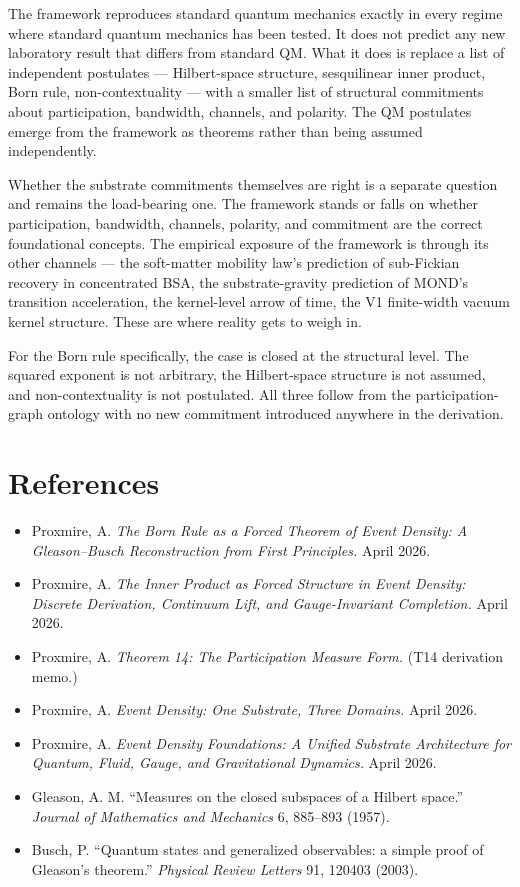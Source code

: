 \documentclass[11pt,a4paper]{article}
\begin{document}
The framework reproduces standard quantum mechanics exactly in every regime where standard quantum mechanics has been tested. It does not predict any new laboratory result that differs from standard QM. What it does is replace a list of independent postulates --- Hilbert-space structure, sesquilinear inner product, Born rule, non-contextuality --- with a smaller list of structural commitments about participation, bandwidth, channels, and polarity. The QM postulates emerge from the framework as theorems rather than being assumed independently.

Whether the substrate commitments themselves are right is a separate question and remains the load-bearing one. The framework stands or falls on whether participation, bandwidth, channels, polarity, and commitment are the correct foundational concepts. The empirical exposure of the framework is through its other channels --- the soft-matter mobility law's prediction of sub-Fickian recovery in concentrated BSA, the substrate-gravity prediction of MOND's transition acceleration, the kernel-level arrow of time, the V1 finite-width vacuum kernel structure. These are where reality gets to weigh in.

For the Born rule specifically, the case is closed at the structural level. The squared exponent is not arbitrary, the Hilbert-space structure is not assumed, and non-contextuality is not postulated. All three follow from the participation-graph ontology with no new commitment introduced anywhere in the derivation.

\section*{References}

\begin{itemize}[leftmargin=*,itemsep=2pt]
  \item Proxmire, A. \emph{The Born Rule as a Forced Theorem of Event Density: A Gleason--Busch Reconstruction from First Principles.} April 2026.
  \item Proxmire, A. \emph{The Inner Product as Forced Structure in Event Density: Discrete Derivation, Continuum Lift, and Gauge-Invariant Completion.} April 2026.
  \item Proxmire, A. \emph{Theorem 14: The Participation Measure Form.} (T14 derivation memo.)
  \item Proxmire, A. \emph{Event Density: One Substrate, Three Domains.} April 2026.
  \item Proxmire, A. \emph{Event Density Foundations: A Unified Substrate Architecture for Quantum, Fluid, Gauge, and Gravitational Dynamics.} April 2026.
  \item Gleason, A. M. ``Measures on the closed subspaces of a Hilbert space.'' \emph{Journal of Mathematics and Mechanics} 6, 885--893 (1957).
  \item Busch, P. ``Quantum states and generalized observables: a simple proof of Gleason's theorem.'' \emph{Physical Review Letters} 91, 120403 (2003).
\end{itemize}
\end{document}
